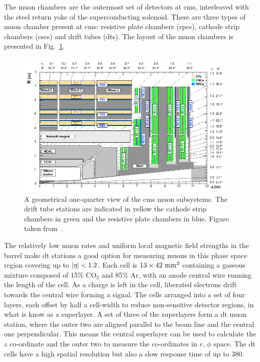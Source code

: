 The muon chambers are the outermost set of detectors at \acrshort{cms}, interleaved with the steel return yoke of the superconducting solenoid.
There are three types of muon chamber present at \acrshort{cms}: resistive plate chambers (\acrshort{rpc}s), cathode strip chambers (\acrshort{csc}s) and drift tubes (\acrshort{dt}s).
The layout of the muon chambers is presented in Fig.~\ref{fig:CMSMuon}.
\begin{figure}[htpb]
	\centering
	\includegraphics[width=0.95\textwidth]{Figures/CMSMUON}
	\caption[A geometrical one-quarter view of the \acrshort{cms} muon subsystems. The drift tube stations are indicated in yellow the cathode strip chambers in green and the resistive plate chambers in blue.]{A geometrical one-quarter view of the \acrshort{cms} muon subsystems. The drift tube stations are indicated in yellow the cathode strip chambers in green and the resistive plate chambers in blue. Figure taken from~\cite{CMSMuon}.}
	\label{fig:CMSMuon}
\end{figure}

The relatively low muon rates and uniform local magnetic field strengths in the barrel make \acrshort{dt} stations a good option for measuring muons in this phase space region covering up to $\lvert \eta \rvert<1.2$.
Each cell is $13\times42\mathrm{~mm}^{2}$ containing a gaseous mixture composed of 15\% $\mathrm{CO}_{2}$ and 85\% $\mathrm{Ar}$, with an anode central wire running the length of the cell.
As a charge is left in the cell, liberated electrons drift towards the central wire forming a signal.
The cells arranged into a set of four layers, each offset by half a cell-width to reduce non-sensitive detector regions, in what is know as a superlayer.
A set of three of the superlayers form a \acrshort{dt} muon station, where the outer two are aligned parallel to the beam line and the central one perpendicular.
This means the central superlayer can be used to calculate the $z$ co-ordinate and the outer two to measure the co-ordinates in $r,\,\phi$ space.
The \acrshort{dt} cells have a high spatial resolution but also a slow response time of up to 380\ns{}.

